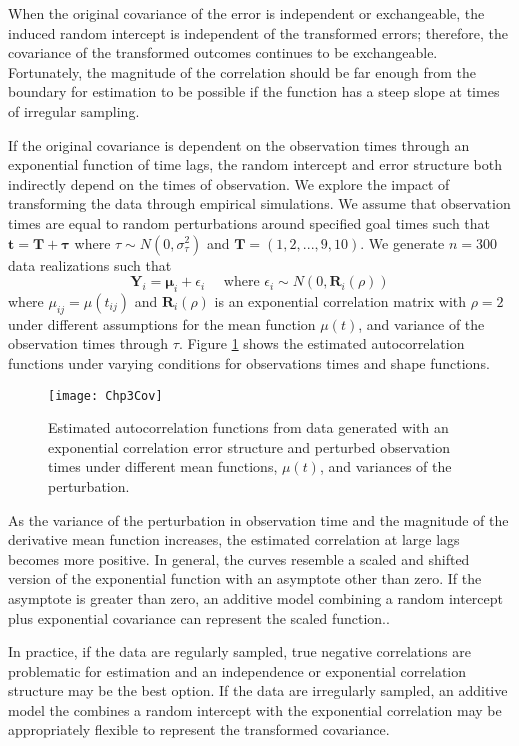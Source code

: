 \documentclass[12pt]{article}
\newcommand{\B}[0]{\mathbf}
\newcommand{\bs}[0]{\boldsymbol}
\begin{document}
When the original covariance of the error is independent or exchangeable, the induced random intercept is independent of the transformed errors; therefore, the covariance of the transformed outcomes continues to be exchangeable. Fortunately, the magnitude of the correlation should be far enough from the boundary for estimation to be possible if the function has a steep slope at times of irregular sampling.

If the original covariance is dependent on the observation times through an exponential function of time lags, the random intercept and error structure both indirectly depend on the times of observation. We explore the impact of transforming the data through empirical simulations. We assume that observation times are equal to random perturbations around specified goal times such that $\B t = \B T + \B \tau$ where $\tau\sim N(0,\sigma^{2}_{\tau})$ and $\B T = (1,2,...,9,10)$. We generate $n=300$ data realizations such that
$$\B Y_{i} = \bs\mu_{i} + \epsilon_{i}\quad\text{ where }\epsilon_{i}\sim N(0,\B R_{i}(\rho))$$
where $\mu_{ij}=\mu(t_{ij})$ and $\B R_{i}(\rho)$ is an exponential correlation matrix with $\rho=2$ under different assumptions for the mean function $\mu(t)$, and variance of the observation times through $\tau$. Figure \ref{fig:cov} shows the estimated autocorrelation functions under varying conditions for observations times and shape functions.
\begin{figure}
\begin{center}
\texttt{[image: Chp3Cov]}
\end{center}
\caption{Estimated autocorrelation functions from data generated with an exponential correlation error structure and perturbed observation times under different mean functions, $\mu(t)$, and variances of the perturbation.}
\label{fig:cov}
\end{figure}

As the variance of the perturbation in observation time and the magnitude of the derivative mean function increases, the estimated correlation at large lags becomes more positive. In general, the curves resemble a scaled and shifted version of the exponential function with an asymptote other than zero. If the asymptote is greater than zero,  an additive model combining a random intercept plus exponential covariance  \cite{diggle2002} can represent the scaled function..

In practice, if the data are regularly sampled, true negative correlations are problematic for estimation and an independence or exponential correlation structure may be the best option. If the data are irregularly sampled, an additive model the combines a random intercept with the exponential correlation may be appropriately flexible to represent the transformed covariance.
\end{document}
